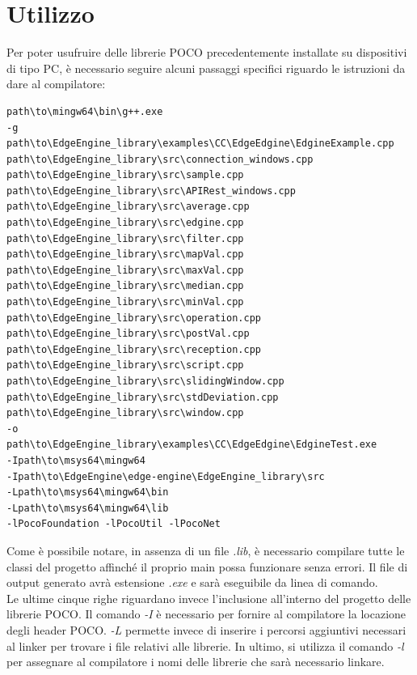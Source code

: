 \section{Utilizzo}
Per poter usufruire delle librerie POCO precedentemente installate su dispositivi di tipo PC, è necessario seguire alcuni passaggi specifici riguardo le istruzioni da dare al compilatore:
\begin{verbatim}
path\to\mingw64\bin\g++.exe 
-g 
path\to\EdgeEngine_library\examples\CC\EdgeEdgine\EdgineExample.cpp
path\to\EdgeEngine_library\src\connection_windows.cpp
path\to\EdgeEngine_library\src\sample.cpp
path\to\EdgeEngine_library\src\APIRest_windows.cpp
path\to\EdgeEngine_library\src\average.cpp
path\to\EdgeEngine_library\src\edgine.cpp
path\to\EdgeEngine_library\src\filter.cpp
path\to\EdgeEngine_library\src\mapVal.cpp
path\to\EdgeEngine_library\src\maxVal.cpp
path\to\EdgeEngine_library\src\median.cpp
path\to\EdgeEngine_library\src\minVal.cpp
path\to\EdgeEngine_library\src\operation.cpp
path\to\EdgeEngine_library\src\postVal.cpp
path\to\EdgeEngine_library\src\reception.cpp
path\to\EdgeEngine_library\src\script.cpp
path\to\EdgeEngine_library\src\slidingWindow.cpp
path\to\EdgeEngine_library\src\stdDeviation.cpp
path\to\EdgeEngine_library\src\window.cpp
-o
path\to\EdgeEngine_library\examples\CC\EdgeEdgine\EdgineTest.exe
-Ipath\to\msys64\mingw64
-Ipath\to\EdgeEngine\edge-engine\EdgeEngine_library\src
-Lpath\to\msys64\mingw64\bin
-Lpath\to\msys64\mingw64\lib
-lPocoFoundation -lPocoUtil -lPocoNet
\end{verbatim}
Come è possibile notare, in assenza di un file \textit{.lib}, è necessario compilare tutte le classi del progetto affinché il proprio main possa funzionare senza errori. Il file di output generato avrà estensione \textit{.exe} e sarà eseguibile da linea di comando.\\
Le ultime cinque righe riguardano invece l'inclusione all'interno del progetto delle librerie POCO. Il comando \textit{-I} è necessario per fornire al compilatore la locazione degli header POCO. \textit{-L}  permette invece di inserire i percorsi aggiuntivi necessari al linker per trovare i file relativi alle librerie. In ultimo, si utilizza il comando \textit{-l} per assegnare al compilatore i nomi delle librerie che sarà necessario linkare.  
\newpage
